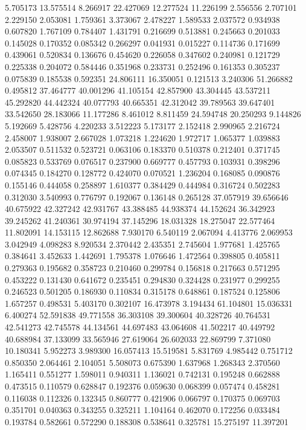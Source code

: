 5.705173
13.575514
8.266917
22.427069
12.277524
11.226199
2.556556
2.707101
2.229150
2.053081
1.759361
3.373067
2.478227
1.589533
2.037572
0.934938
0.607820
1.767109
0.784407
1.431791
0.216699
0.513881
0.245663
0.201033
0.145028
0.170352
0.085342
0.266297
0.041931
0.015227
0.114736
0.171699
0.439061
0.520834
0.136676
0.454620
0.226058
0.347602
0.240981
0.121729
0.225338
0.204072
0.584446
0.351968
0.233731
0.252496
0.161353
0.305237
0.075839
0.185538
0.592351
24.806111
16.350051
0.121513
3.240306
51.266882
0.495812
37.464777
40.001296
41.105154
42.857900
43.304445
43.537211
45.292820
44.442324
40.077793
40.665351
42.312042
39.789563
39.647401
33.542650
28.183066
11.177286
8.461012
8.811459
24.594748
20.250293
9.144826
5.192669
5.428756
4.220233
3.512223
5.173177
2.152418
2.990965
2.216724
2.458007
1.938007
2.667028
1.073218
1.224620
1.972717
1.065377
1.039883
2.053507
0.511532
0.523721
0.063106
0.183370
0.510378
0.212401
0.371745
0.085823
0.533769
0.076517
0.237900
0.669777
0.457793
0.103931
0.398296
0.074345
0.184270
0.128772
0.424070
0.070521
1.236204
0.168085
0.090876
0.155146
0.444058
0.258897
1.610377
0.384429
0.444984
0.316724
0.502283
0.312030
3.540993
0.776797
0.192067
0.136148
0.265128
37.057919
39.656646
40.675922
42.327242
42.931767
43.388485
44.938374
44.152624
36.342923
39.245262
41.240361
30.974194
37.145296
18.031328
18.275047
22.577464
11.802091
14.153115
12.862688
7.930170
6.540119
2.067094
4.413776
2.069953
3.042949
4.098283
8.920534
2.370442
2.435351
2.745604
1.977681
1.425765
0.384641
3.452633
1.442691
1.795378
1.076646
1.472564
0.398805
0.405811
0.279363
0.195682
0.358723
0.210460
0.299784
0.156818
0.217663
0.571295
0.453222
0.131430
0.641672
0.235451
0.294830
0.324428
0.231977
0.299255
0.246523
0.501205
0.186930
0.110834
0.315178
0.648861
0.187524
0.125806
1.657257
0.498531
5.403170
0.302107
16.473978
3.194434
61.104801
15.036331
6.400274
52.591838
49.771558
36.303108
39.300604
40.328726
40.764531
42.541273
42.745578
44.134561
44.697483
43.064608
41.502217
40.449792
40.688984
37.133099
33.565946
27.619064
26.602033
22.869799
7.371080
10.180341
5.952273
3.989300
16.057413
15.519581
5.831769
4.985442
0.751712
0.850350
2.064461
2.104051
5.508073
0.675390
1.637968
1.268343
2.370560
1.165411
0.551277
1.598011
0.940311
1.136021
0.742131
0.195248
0.662888
0.473515
0.110579
0.628847
0.192376
0.059630
0.068399
0.057474
0.458281
0.116038
0.112326
0.132345
0.860777
0.421906
0.066797
0.170375
0.069703
0.351701
0.040363
0.343255
0.325211
1.104164
0.462070
0.172256
0.033484
0.193784
0.582661
0.572290
0.188308
0.538641
0.325781
15.275197
11.397201
